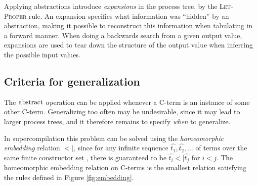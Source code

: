 \documentclass[10pt]{../sigplanconf}
\begin{document}
Applying abstractions introduce \emph{expansions} in the process tree,
by the \textsc{Let-Proper} rule. An expansion specifies what
information was ``hidden'' by an abstraction, making it possible to
reconstruct this information when tabulating in a forward manner. When
doing a backwards search from a given output value, expansions are
used to tear down the structure of the output value when inferring the
possible input values.

\subsection{Criteria for generalization}
The ${\rm abstract}$ operation can be applied whenever a C-term is an
instance of some other C-term. Generalizing too often may be
undesirable, since it may lead to larger process trees, and it
therefore remains to specify \emph{when} to generalize.

In supercompilation\cite{sorensen1998introduction} this problem can be
solved using the \emph{homeomorphic embedding} relation $<|$, since
for any infinite sequence $\widehat{t_1}, \widehat{t_2}, ...$ of terms
over the same finite constructor set , there is guaranteed to be
$\widehat{t_i} <| \widehat{t_j}$ for $i < j$. The homeomorphic
embedding relation on C-terms is the smallest relation satisfying the
rules defined in Figure \ref{fig:embedding}.
\end{document}
